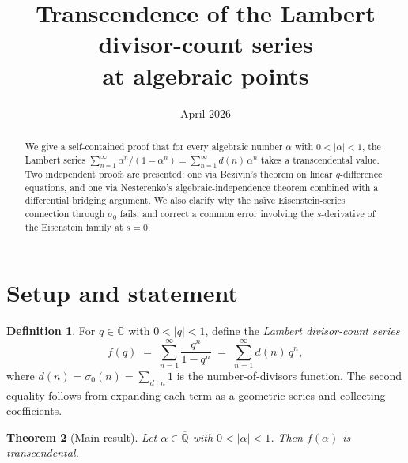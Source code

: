 \documentclass[12pt]{amsart}
\title{Transcendence of the Lambert divisor-count series\\
at algebraic points}
\author{}
\date{April 2026}
\newtheorem{theorem}{Theorem}
\theoremstyle{definition}
\newtheorem{definition}[theorem]{Definition}
\theoremstyle{remark}
\begin{document}
\maketitle

\begin{abstract}
We give a self-contained proof that for every algebraic number
$\alpha$ with $0<|\alpha|<1$, the Lambert series
$\sum_{n=1}^{\infty}\alpha^n/(1-\alpha^n)=\sum_{n=1}^{\infty}d(n)\,\alpha^n$
takes a transcendental value. Two independent proofs are presented:
one via B\'ezivin's theorem on linear $q$-difference equations, and
one via Nesterenko's algebraic-independence theorem combined with a
differential bridging argument. We also clarify why the na\"ive
Eisenstein-series connection through $\sigma_0$ fails, and
correct a common error involving the $s$-derivative of the
Eisenstein family at $s=0$.
\end{abstract}

\section{Setup and statement}

\begin{definition}
For $q\in\mathbb{C}$ with $0<|q|<1$, define the
\emph{Lambert divisor-count series}
\begin{equation}\label{eq:f}
  f(q) \;=\; \sum_{n=1}^{\infty}\frac{q^n}{1-q^n}
       \;=\; \sum_{n=1}^{\infty} d(n)\,q^n,
\end{equation}
where $d(n)=\sigma_0(n)=\sum_{d\mid n}1$ is the number-of-divisors
function. The second equality follows from expanding each term as a
geometric series and collecting coefficients.
\end{definition}

\begin{theorem}[Main result]\label{thm:main}
Let $\alpha\in\overline{\mathbb{Q}}$ with $0<|\alpha|<1$. Then
$f(\alpha)$ is transcendental.
\end{theorem}
\end{document}
